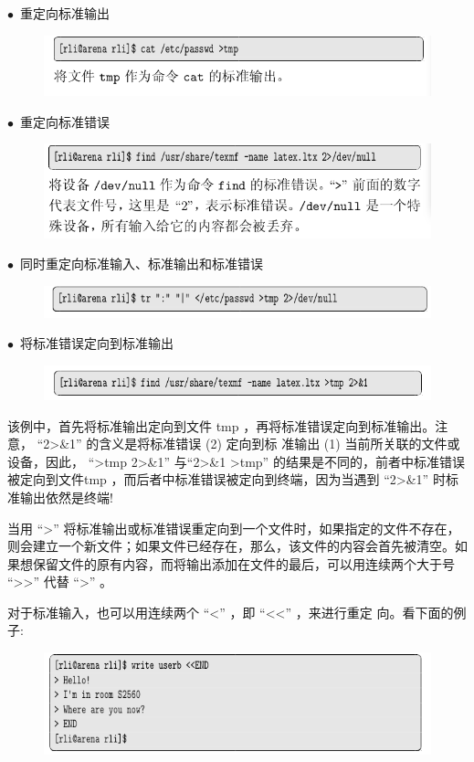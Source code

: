 \documentclass[12pt，a4paper]{article}
\numberwithin{equation}{section}
\begin{document}
$\bullet$~重定向标准输出
\begin{figure}[H]
\centering
\includegraphics[scale=0.6]{./figures/232.png}
\end{figure}
$\bullet$~重定向标准错误
\begin{figure}[H]
\centering
\includegraphics[scale=0.6]{./figures/233.png}
\end{figure}
$\bullet$~同时重定向标准输入、标准输出和标准错误
\begin{figure}[H]
\centering
\includegraphics[scale=0.6]{./figures/234.png}
\end{figure}
$\bullet$~将标准错误定向到标准输出
\begin{figure}[H]
\centering
\includegraphics[scale=0.6]{./figures/235.png}
\end{figure}
该例中，首先将标准输出定向到文件 tmp ，再将标准错误定向到标准输出。注意， “2>\&1” 的含义是将标准错误 (2) 定向到标
准输出 (1) 当前所关联的文件或设备，因此， “>tmp 2>\&1” 与“2>\&1 >tmp” 的结果是不同的，前者中标准错误被定向到文件tmp ，而后者中标准错误被定向到终端，因为当遇到 “2>\&1” 时标准输出依然是终端!

当用 “>” 将标准输出或标准错误重定向到一个文件时，如果指定的文件不存在，则会建立一个新文件；如果文件已经存在，那么，该文件的内容会首先被清空。如果想保留文件的原有内容，而将输出添加在文件的最后，可以用连续两个大于号 “>>” 代替 “>” 。

对于标准输入，也可以用连续两个 “<” ，即 “<<” ，来进行重定
向。看下面的例子:
\begin{figure}[H]
\centering
\includegraphics[scale=0.6]{./figures/290.png}
\end{figure}
\end{document}
